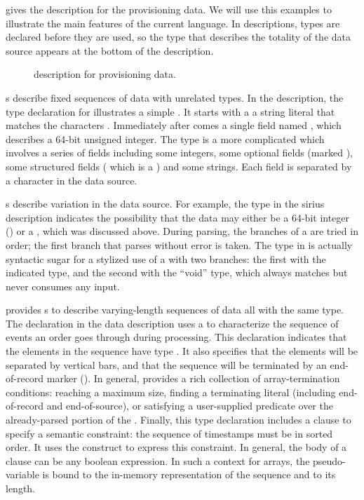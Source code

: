 \documentclass[11pt]{article}
\begin{document}
 gives the \pads{} description for the \dibbler{} 
provisioning data.  We will use this examples to illustrate the main 
features of the current
\pads{} language.  In \pads{} descriptions, types are declared before they are used, 
so the type that describes the totality of the data source appears at the bottom of 
the description.


\begin{figure}

\caption{\pads{} description for \dibbler{} provisioning data.}
\label{figure:dibbler}
\end{figure}


s describe fixed sequences of data with unrelated types.
In the \dibbler{} description, the type declaration for
 illustrates a simple . It starts with a 
a string literal that matches the characters .  Immediately after
comes a single field named , which describes a 64-bit unsigned integer.
The type  is a more complicated  which involves
a series of fields including some integers, some optional fields (marked ), some 
structured fields ( which is a ) and some strings.
Each field is separated by a \cd{|} character in the data source.


s describe variation in the data source.  For example, the
 type in the sirius description indicates the possibility that
the data may either be a 64-bit integer () or a
, which was discussed above.  During parsing, 
the branches of a  are tried in order; the first branch that 
parses without error is taken.  
The  type in  is actually syntactic sugar for a 
stylized use of a  with two branches: the first with the indicated type, 
and the second with the ``void'' type, which  
always matches but never consumes any input.


\pads{} provides s to describe varying-length sequences of data all 
with the same type.  The  declaration in the \dibbler{} data description
uses a  to characterize the sequence of events an
order goes through during processing.  This declaration indicates that the elements
in the sequence have type .  It also specifies that the elements will
be separated by vertical bars, and that the sequence will be terminated by 
an end-of-record marker ().  In general, \pads{} provides a rich collection
of array-termination conditions: reaching a maximum size, finding a terminating
literal (including end-of-record and end-of-source),
or satisfying a user-supplied predicate over the already-parsed portion of 
the .  Finally, this type declaration includes a  clause
to specify a semantic constraint:  
the sequence of timestamps must be in sorted order.
It uses the  construct to express this constraint.
In general, the body of a  clause can be any boolean expression.
In such a context for arrays, the pseudo-variable  is bound to the in-memory representation of the sequence and  to its length.
\end{document}
